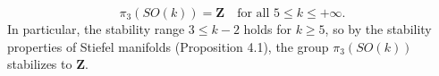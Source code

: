 $$\pi_3(SO(k)) = \mathbf{Z} \quad \text{for all } 5 \leq k \leq +\infty.$$
In particular, the stability range $3 \leq k-2$ holds for $k \geq 5$, so by the stability properties of Stiefel manifolds (Proposition 4.1), the group $\pi_3(SO(k))$ stabilizes to $\mathbf{Z}$.
